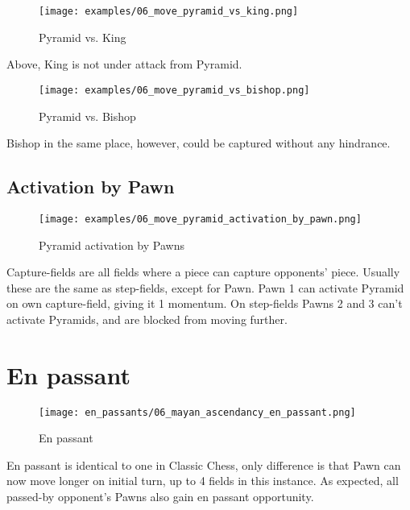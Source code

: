 \noindent
\begin{figure}[!h]
\texttt{[image: examples/06\_move\_pyramid\_vs\_king.png]}
\caption{Pyramid vs. King}
\label{fig:pyramid_vs_king}
\end{figure}

Above, King is not under attack from Pyramid.

\noindent
\begin{figure}[!h]
\texttt{[image: examples/06\_move\_pyramid\_vs\_bishop.png]}
\caption{Pyramid vs. Bishop}
\label{fig:pyramid_vs_bishop}
\end{figure}

Bishop in the same place, however, could be captured without any hindrance.

\clearpage %

\subsection*{Activation by Pawn}

\noindent
\begin{figure}[!h]
\texttt{[image: examples/06\_move\_pyramid\_activation\_by\_pawn.png]}
\caption{Pyramid activation by Pawns}
\label{fig:ma_activation_by_pawns}
\end{figure}

Capture-fields are all fields where a piece can capture opponents' piece.
Usually these are the same as step-fields, except for Pawn. Pawn 1 can
activate Pyramid on own capture-field, giving it 1 momentum. On step-fields
Pawns 2 and 3 can't activate Pyramids, and are blocked from moving further.

\clearpage %

\section*{En passant}

\noindent
\begin{wrapfigure}{l}{0.4\textwidth}
\texttt{[image: en\_passants/06\_mayan\_ascendancy\_en\_passant.png]}
\caption{En passant}
\label{fig:ma_en_passant}
\end{wrapfigure}
En passant is identical to one in Classic Chess, only difference is that Pawn can now
move longer on initial turn, up to 4 fields in this instance. As expected, all passed-by
opponent's Pawns also gain en passant opportunity.


